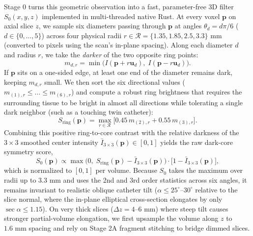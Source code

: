 \documentclass[
  11pt,
]{article}
\begin{document}
Stage 0 turns this geometric observation into a fast, parameter-free 3D
filter \(S_0(x,y,z)\) implemented in multi-threaded native Rust. At
every voxel \(\mathbf{p}\) on axial slice \(z\), we sample six diameters
passing through \(\mathbf{p}\) at angles \(\theta_d = d\pi/6\)
(\(d \in \{0, \dots, 5\}\)) across four physical radii
\(r \in \mathcal{R} = \{1.35, 1.85, 2.5, 3.3\}\text{ mm}\) (converted to
pixels using the scan's in-plane spacing). Along each diameter \(d\) and
radius \(r\), we take the \emph{darker} of the two opposite ring points:
\[m_{d,r} = \min\!\big(I(\mathbf{p} + r\mathbf{u}_d),\; I(\mathbf{p} - r\mathbf{u}_d)\big).\]
If \(\mathbf{p}\) sits on a one-sided edge, at least one end of the
diameter remains dark, keeping \(m_{d,r}\) small. We then sort the six
directional values (\(m_{(1),r} \le \dots \le m_{(6),r}\)) and compute a
robust ring brightness that requires the surrounding tissue to be bright
in almost all directions while tolerating a single dark neighbor (such
as a touching twin catheter):
\[S_{\text{ring}}(\mathbf{p}) = \max_{r \in \mathcal{R}} \big[0.45\, m_{(2),r} + 0.55\, m_{(3),r}\big].\]
Combining this positive ring-to-core contrast with the relative darkness
of the \(3 \times 3\) smoothed center intensity
\(\bar{I}_{3\times 3}(\mathbf{p}) \in [0, 1]\) yields the raw dark-core
symmetry score,
\[S_0(\mathbf{p}) \propto \max\!\big(0,\; S_{\text{ring}}(\mathbf{p}) - \bar{I}_{3\times 3}(\mathbf{p})\big)\cdot\big[1 - \bar{I}_{3\times 3}(\mathbf{p})\big],\]
which is normalized to \([0, 1]\) per volume. Because \(S_0\) takes the
maximum over radii up to \(3.3\text{ mm}\) and uses the 2nd and 3rd
order statistics across six angles, it remains invariant to realistic
oblique catheter tilt (\(\alpha \le 25^\circ\text{--}30^\circ\) relative
to the slice normal, where the in-plane elliptical cross-section
elongates by only \(\sec\alpha \le 1.15\)). On very thick slices
(\(\Delta z = 4\text{--}6\text{ mm}\)) where steep tilt causes stronger
partial-volume elongation, we first upsample the volume along \(z\) to
\(1.6\text{ mm}\) spacing and rely on Stage 2A fragment stitching to
bridge dimmed slices.
\end{document}
